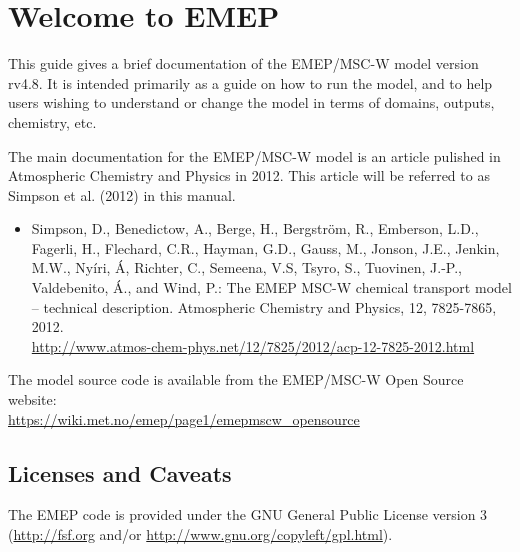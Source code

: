 
\chapter{Welcome to EMEP }

This guide gives a brief documentation of the EMEP/MSC-W model
version rv4.8. 
It is intended primarily as a guide on how to run the model, and
to help users wishing to understand or change 
the model in terms of domains, outputs, chemistry, etc.


The main documentation for the EMEP/MSC-W model is an article pulished 
in Atmospheric Chemistry and Physics in 2012. 
This article will be referred to as Simpson et al. (2012) in
this manual. 


\begin{itemize}
\item
Simpson, D., Benedictow, A., Berge, H., Bergstr\"om, R., Emberson, L.D., Fagerli, H., Flechard, C.R., Hayman, G.D., Gauss, M., Jonson, J.E., Jenkin, M.W., Ny\'iri, \'A, Richter, C., Semeena, V.S, Tsyro, S., Tuovinen, J.-P., Valdebenito, \'A., and Wind, P.:
The EMEP MSC-W chemical transport model – technical description.  
Atmospheric Chemistry and Physics, 12, 7825-7865, 2012.\\
\url{http://www.atmos-chem-phys.net/12/7825/2012/acp-12-7825-2012.html}
\end{itemize}


The model source code is available from the EMEP/MSC-W Open Source website:\\ 
\url{https://wiki.met.no/emep/page1/emepmscw_opensource}

\newpage

\section{Licenses and Caveats}

The EMEP code is provided under the GNU General Public License version 3
(\url{http://fsf.org} and/or
\url{http://www.gnu.org/copyleft/gpl.html}).

